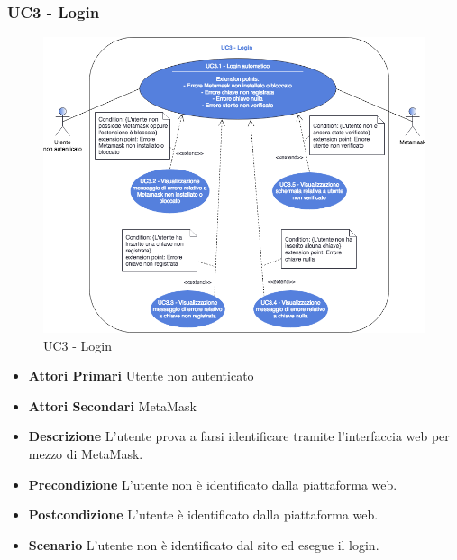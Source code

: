 \subsubsection{UC3 - Login}
\begin{figure}[h]
\includegraphics[width=14.5cm]{res/images/UC3Login.png}
\centering
\caption{UC3 - Login}

\end{figure}
\begin{itemize}
	\item \textbf{Attori Primari}
	Utente non autenticato
	\item \textbf{Attori Secondari}
	MetaMask\glo
	\item \textbf{Descrizione}
	L'utente prova a farsi identificare tramite l'interfaccia web per mezzo di MetaMask\glo.
	\item \textbf{Precondizione}
	L'utente non è identificato dalla piattaforma web.
	\item \textbf{Postcondizione}
	L'utente è identificato dalla piattaforma web. 
	\item \textbf{Scenario}
	L'utente non è identificato dal sito ed esegue il login.
\end{itemize}
